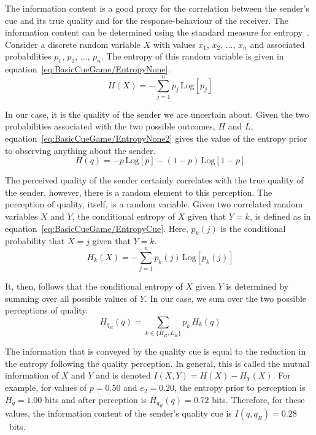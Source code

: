 \documentclass[a4paper,12pt]{article}
\numberwithin{equation}{section}
\begin{document}
The information content is a good proxy for the correlation between the sender's cue and its true quality and for the response-behaviour of the receiver. The information content can be determined using the standard measure for entropy~\cite{Applebaum1996}. Consider a discrete random variable $X$ with values $x_{1}$, $x_{2}$, ..., $x_{n}$ and associated probabilities $p_{1}$, $p_{2}$, ..., $p_{n}$. The entropy of this random variable is given in equation~\ref{eq:BasicCueGame/EntropyNone}.
\begin{equation}
\label{eq:BasicCueGame/EntropyNone}\
H(X) = - \sum_{j=1}^{n} p_{j} \, \text{Log}[p_{j}]
\end{equation}

In our case, it is the quality of the sender we are uncertain about. Given the two probabilities associated with the two possible outcomes, $H$ and $L$, equation~\ref{eq:BasicCueGame/EntropyNone2} gives the value of the entropy prior to observing anything about the sender.
\begin{equation}
\label{eq:BasicCueGame/EntropyNone2}\
H(q) = - p \, \text{Log}[p] - (1-p) \, \text{Log}[1-p]
\end{equation}

The perceived quality of the sender certainly correlates with the true quality of the sender, however, there is a random element to this perception. The perception of quality, itself, is a random variable. Given two correlated random variables $X$ and $Y$, the conditional entropy of $X$ given that $Y = k$, is defined as in equation~\ref{eq:BasicCueGame/EntropyCue}. Here, $p_{k}(j)$ is the conditional probability that $X = j$ given that $Y = k$.
\begin{equation}
\label{eq:BasicCueGame/EntropyCue}\
H_{k}(X) = - \sum_{j=1}^{n} p_{k}(j) \, \text{Log}[p_{k}(j)]
\end{equation}

It, then, follows that the conditional entropy of $X$ given $Y$ is determined by summing over all possible values of $Y$. In our case, we sum over the two possible perceptions of quality.
\begin{equation}
\label{eq:BasicCueGame/EntropyCue2}\
H_{q_{R}}(q) = \sum_{k \in \{H_{R}, L_{R}\}} p_{k} \, H_{k}(q)
\end{equation}

The information that is conveyed by the quality cue is equal to the reduction in the entropy following the quality perception. In general, this is called the mutual information of $X$ and $Y$ and is denoted $I(X,Y) = H(X) - H_{Y}(X)$. For example, for values of $p = 0.50$ and $e_{2} = 0.20$, the entropy prior to perception is $H_{q} = 1.00$ bits and after perception is $H_{q_{R}}(q) = 0.72$ bits. Therefore, for these values, the information content of the sender's quality cue is $I(q, q_{R}) = 0.28$~bits.
\end{document}
